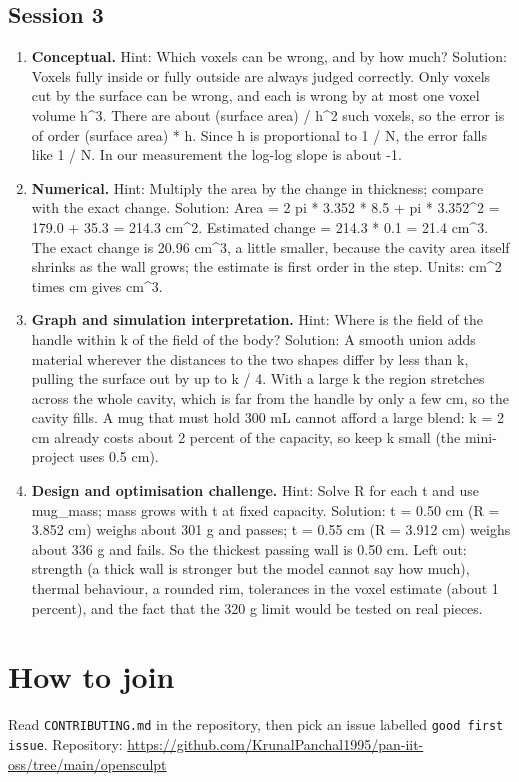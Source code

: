 \documentclass[11pt,a4paper]{article}
\begin{document}
\subsection*{Session 3}
\begin{enumerate}[nosep]
\item \textbf{Conceptual.} Hint: Which voxels can be wrong, and by how much? Solution: Voxels fully inside or fully outside are always judged correctly. Only voxels cut by the surface can be wrong, and each is wrong by at most one voxel volume h\textasciicircum{}3. There are about (surface area) / h\textasciicircum{}2 such voxels, so the error is of order (surface area) * h. Since h is proportional to 1 / N, the error falls like 1 / N. In our measurement the log-log slope is about -1.
\item \textbf{Numerical.} Hint: Multiply the area by the change in thickness; compare with the exact change. Solution: Area = 2 pi * 3.352 * 8.5 + pi * 3.352\textasciicircum{}2 = 179.0 + 35.3 = 214.3 cm\textasciicircum{}2. Estimated change = 214.3 * 0.1 = 21.4 cm\textasciicircum{}3. The exact change is 20.96 cm\textasciicircum{}3, a little smaller, because the cavity area itself shrinks as the wall grows; the estimate is first order in the step. Units: cm\textasciicircum{}2 times cm gives cm\textasciicircum{}3.
\item \textbf{Graph and simulation interpretation.} Hint: Where is the field of the handle within k of the field of the body? Solution: A smooth union adds material wherever the distances to the two shapes differ by less than k, pulling the surface out by up to k / 4. With a large k the region stretches across the whole cavity, which is far from the handle by only a few cm, so the cavity fills. A mug that must hold 300 mL cannot afford a large blend: k = 2 cm already costs about 2 percent of the capacity, so keep k small (the mini-project uses 0.5 cm).
\item \textbf{Design and optimisation challenge.} Hint: Solve R for each t and use mug\_mass; mass grows with t at fixed capacity. Solution: t = 0.50 cm (R = 3.852 cm) weighs about 301 g and passes; t = 0.55 cm (R = 3.912 cm) weighs about 336 g and fails. So the thickest passing wall is 0.50 cm. Left out: strength (a thick wall is stronger but the model cannot say how much), thermal behaviour, a rounded rim, tolerances in the voxel estimate (about 1 percent), and the fact that the 320 g limit would be tested on real pieces.
\end{enumerate}

\section{How to join}
Read \texttt{CONTRIBUTING.md} in the repository, then pick an issue labelled \texttt{good first issue}. Repository: \url{https://github.com/KrunalPanchal1995/pan-iit-oss/tree/main/opensculpt}
\end{document}
